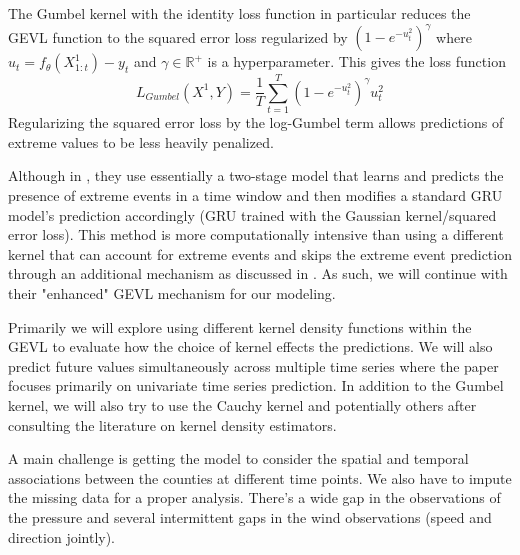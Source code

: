 \documentclass[conference]{IEEEtran}
\begin{document}
The Gumbel kernel with the identity loss function in particular reduces the GEVL function to the squared error loss regularized by $(1 - e^{-u_t^2})^\gamma$ where $u_t = f_\theta(X^1_{1:t}) - y_t$ and $\gamma \in \mathbb{R}^+$ is a hyperparameter. This gives the loss function 
$$L_{Gumbel}(X^1, Y) = \frac{1}{T} \sum_{t=1}^T (1 - e^{-u_t^2})^\gamma u_t^2$$
Regularizing the squared error loss by the log-Gumbel term allows predictions of extreme values to be less heavily penalized. 


Although in \cite{dingModelingExtremeEvents2019}, they use essentially a two-stage model that learns and predicts the presence of extreme events in a time window and then modifies a standard GRU model's prediction accordingly (GRU trained with the Gaussian kernel/squared error loss). This method is more computationally intensive than using a different kernel that can account for extreme events and skips the extreme event prediction through an additional mechanism as discussed in \cite{zhangEnhancingTimeSeries2021}. As such, we will continue with their "enhanced" GEVL mechanism for our modeling. 


Primarily we will explore using different kernel density functions within the GEVL to evaluate how the choice of kernel effects the predictions. We will also predict future values simultaneously across multiple time series where the \cite{zhangEnhancingTimeSeries2021} paper focuses primarily on univariate time series prediction. In addition to the Gumbel kernel, we will also try to use the Cauchy kernel and potentially others after consulting the literature on kernel density estimators.



A main challenge is getting the model to consider the spatial and temporal associations between the counties at different time points. We also have to impute the missing data for a proper analysis. There's a wide gap in the observations of the pressure and several intermittent gaps in the wind observations (speed and direction jointly).
\end{document}

